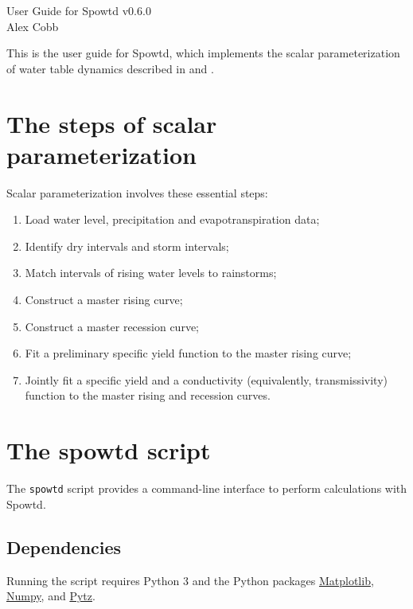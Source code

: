 \documentclass[11pt,a4paper]{article}
\begin{document}
\lstset{language=bash}

{\huge User Guide for Spowtd v0.6.0}\\[2ex]
{\large Alex Cobb}\\[0ex]

\renewcommand{\baselinestretch}{1.18}\normalsize

This is the user guide for Spowtd, which implements the scalar
parameterization of water table dynamics described in
\citet{Cobb_et_al_2017} and \citet{Cobb_and_Harvey_2019}.

\section{The steps of scalar parameterization}
Scalar parameterization involves these essential steps:
\begin{enumerate}
\item Load water level, precipitation and evapotranspiration data;
\item Identify dry intervals and storm intervals;
\item Match intervals of rising water levels to rainstorms;
\item Construct a master rising curve;
\item Construct a master recession curve;
\item Fit a preliminary specific yield function to the master rising
  curve;
\item Jointly fit a specific yield and a conductivity (equivalently,
  transmissivity) function to the master rising and recession curves.
\end{enumerate}

\section{The spowtd script}
The \texttt{spowtd} script provides a command-line interface to
perform calculations with Spowtd.

\subsection{Dependencies}
Running the script requires Python 3 and the Python packages
\href{https://matplotlib.org/}{Matplotlib},
\href{https://numpy.org/}{Numpy}, and
\href{https://pypi.org/project/pytz/}{Pytz}.
\end{document}
